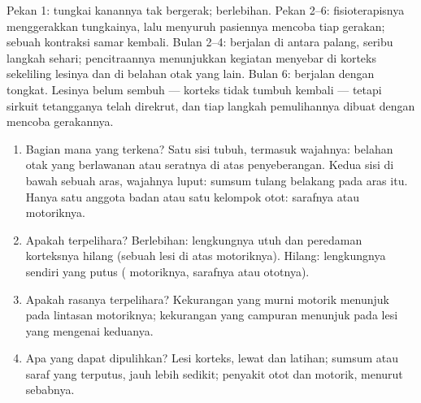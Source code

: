 \begin{example}\label{ex:g12:brain-and-movement:sixmonths}
Pekan 1: tungkai kanannya tak bergerak;  berlebihan. Pekan
2--6: fisioterapisnya menggerakkan tungkainya, lalu menyuruh pasiennya
mencoba tiap gerakan; sebuah kontraksi samar kembali. Bulan 2--4:
berjalan di antara palang, seribu langkah sehari; pencitraannya
menunjukkan kegiatan menyebar di korteks sekeliling lesinya dan di
belahan otak yang lain. Bulan 6: berjalan dengan tongkat. Lesinya
belum sembuh ---  korteks tidak tumbuh kembali --- tetapi sirkuit
tetangganya telah direkrut, dan tiap langkah pemulihannya dibuat
dengan mencoba gerakannya.
\end{example}

\begin{method}\label{met:g12:brain-and-movement:locate}
\begin{enumerate}
  \item Bagian mana yang terkena? Satu sisi tubuh, termasuk wajahnya:
        belahan otak yang berlawanan atau seratnya di atas
        penyeberangan. Kedua sisi di bawah sebuah aras, wajahnya luput:
        sumsum tulang belakang pada aras itu. Hanya satu anggota badan
        atau satu kelompok otot: sarafnya atau  motoriknya.
  \item Apakah  terpelihara? Berlebihan: lengkungnya utuh dan
        peredaman korteksnya hilang (sebuah lesi di atas 
        motoriknya). Hilang: lengkungnya sendiri yang putus (
        motoriknya, sarafnya atau ototnya).
  \item Apakah rasanya terpelihara? Kekurangan yang murni motorik
        menunjuk pada lintasan motoriknya; kekurangan yang campuran
        menunjuk pada lesi yang mengenai keduanya.
  \item Apa yang dapat dipulihkan? Lesi korteks, lewat  dan
        latihan; sumsum atau saraf yang terputus, jauh lebih sedikit;
        penyakit otot dan  motorik, menurut sebabnya.
\end{enumerate}
\end{method}

